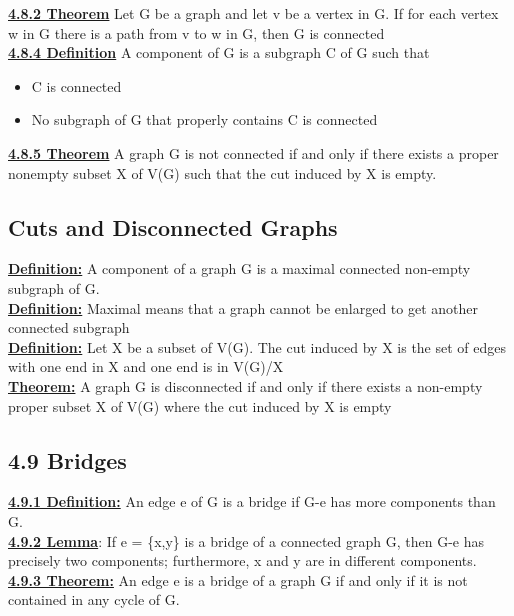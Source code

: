 \documentclass[12pt]{article}
\newcommand{\myt}[1]{\textbf{\underline{#1}}}
\begin{document}
	\myt{4.8.2 Theorem} Let G be a graph and let v be a vertex in G. If for each vertex w in G there is a path from v to w in G, then G is connected\\
	
	\myt{4.8.4 Definition} A component of G is a subgraph C of G such that\\
	\begin{itemize}
		\item C is connected
		\item No subgraph of G that properly contains C is connected
	\end{itemize}
	
	\myt{4.8.5 Theorem} A graph G is not connected if and only if there exists a proper nonempty subset X of V(G) such that the cut induced by X is empty.\\
	
	\subsection*{Cuts and Disconnected Graphs}
	\myt{Definition:} A component of a graph G is a maximal connected non-empty subgraph of G.\\
	
	\myt{Definition:} Maximal means that a graph cannot be enlarged to get another connected subgraph\\
	
	\myt{Definition:} Let X be a subset of V(G). The cut induced by X is the set of edges with one end in X and one end is in V(G)/X\\
	
	\myt{Theorem:} A graph G is disconnected if and only if there exists a non-empty proper subset X of V(G) where the cut induced by X is empty\\
	
	
	\subsection*{4.9 Bridges}
	\myt{4.9.1 Definition:} An edge e of G is a bridge if G-e has more components than G.\\
	
	\myt{4.9.2 Lemma}: If e = \{x,y\} is a bridge of a connected graph G, then G-e has precisely two components; furthermore, x and y are in different components.\\
	
	\myt{4.9.3 Theorem:} An edge e is a bridge of a graph G if and only if it is not contained in any cycle of G.\\
	
\end{document}
